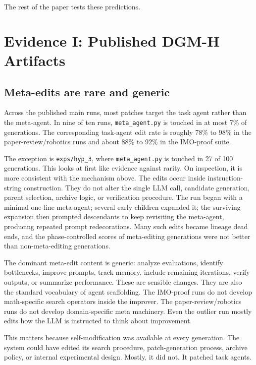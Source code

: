 \documentclass[11pt]{article}
\begin{document}
The rest of the paper tests these predictions.

\section{Evidence I: Published DGM-H Artifacts}\label{evidence-i-published-dgm-h-artifacts}

\subsection{Meta-edits are rare and generic}\label{meta-edits-are-rare-and-generic}

Across the published main runs, most patches target the task agent rather than the meta-agent. In nine of ten runs, \texttt{meta\_agent.py} is touched in at most 7\% of generations. The corresponding task-agent edit rate is roughly 78\% to 98\% in the paper-review/robotics runs and about 88\% to 92\% in the IMO-proof suite.

The exception is \texttt{exps/hyp\_3}, where \texttt{meta\_agent.py} is touched in 27 of 100 generations. This looks at first like evidence against rarity. On inspection, it is more consistent with the mechanism above. The edits occur inside instruction-string construction. They do not alter the single LLM call, candidate generation, parent selection, archive logic, or verification procedure. The run began with a minimal one-line meta-agent; several early children expanded it; the surviving expansion then prompted descendants to keep revisiting the meta-agent, producing repeated prompt redecorations. Many such edits became lineage dead ends, and the phase-controlled scores of meta-editing generations were not better than non-meta-editing generations.

The dominant meta-edit content is generic: analyze evaluations, identify bottlenecks, improve prompts, track memory, include remaining iterations, verify outputs, or summarize performance. These are sensible changes. They are also the standard vocabulary of agent scaffolding. The IMO-proof runs do not develop math-specific search operators inside the improver. The paper-review/robotics runs do not develop domain-specific meta machinery. Even the outlier run mostly edits how the LLM is instructed to think about improvement.

This matters because self-modification was available at every generation. The system could have edited its search procedure, patch-generation process, archive policy, or internal experimental design. Mostly, it did not. It patched task agents.
\end{document}
